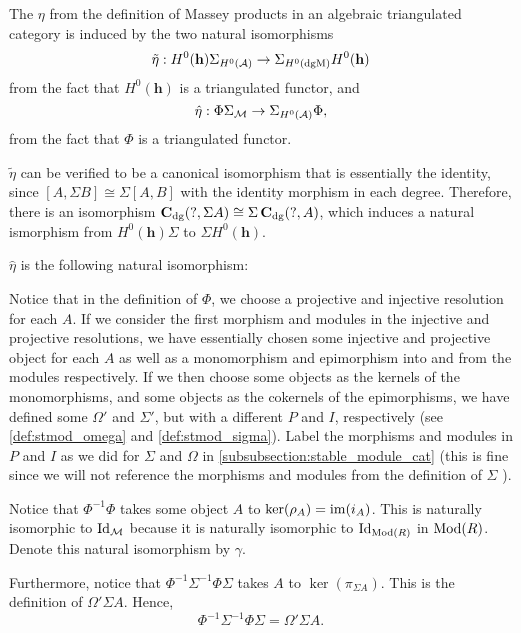 \begin{remark}
    The \( \eta \) from the definition of Massey products in an algebraic triangulated category is induced by the two natural isomorphisms
    \[
        \tilde{\eta}: H^0(\mathbf{h}) \Sigma_{H^0({\mathcal{A}})} \to \Sigma_{H^0(\operatorname{dgM})} H^0(\mathbf{h})
    \]
    from the fact that \( H^0(\mathbf{h}) \) is a triangulated functor, and
    \[
        \hat{\eta}: \Phi \Sigma_{{\mathcal{M}}} \to \Sigma_{H^0({\mathcal{A}})} \Phi,
    \]
    from the fact that \( \Phi \) is a triangulated functor.

    \( \tilde{\eta} \) can be verified to be a canonical isomorphism that is essentially the identity, since \( [A, \Sigma B] \cong \Sigma [A, B] \) with the identity morphism in each degree. Therefore, there is an isomorphism \( \operatorname{\mathbf{C}}_{\operatorname{dg}}(?, \Sigma A) \cong \Sigma \operatorname{\mathbf{C}}_{\operatorname{dg}}(?, A) \), which induces a natural ismorphism from \( H^0(\mathbf{h}) \Sigma \) to \( \Sigma H^0(\mathbf{h}) \).

    \( \hat{\eta} \) is the following natural isomorphism:

    Notice that in the definition of \( \Phi \), we choose a projective and injective resolution for each \( A \). If we consider the first morphism and modules in the injective and projective resolutions, we have essentially chosen some injective and projective object for each \( A \) as well as a monomorphism and epimorphism into and from the modules respectively. If we then choose some objects as the kernels of the monomorphisms, and some objects as the cokernels of the epimorphisms, we have defined some \( \Omega' \) and \( \Sigma' \), but with a different \( P \) and \( I \), respectively (see \autoref{def:stmod_omega} and \autoref{def:stmod_sigma}). Label the morphisms and modules in \( P \) and \( I \) as we did for \( \Sigma \) and \( \Omega \) in \autoref{subsubsection:stable_module_cat} (this is fine since we will not reference the morphisms and modules from the definition of \( \Sigma \) ).

    Notice that \( \Phi^{-1} \Phi \) takes some object \( A \) to \( \ker(\rho_A) = \operatorname{im}(i_A) \). This is naturally isomorphic to \( \operatorname{Id}_{{\mathcal{M}}} \) because it is naturally isomorphic to \( \operatorname{Id}_{\operatorname{Mod}(R)} \) in \( \operatorname{Mod}(R) \). Denote this natural isomorphism by \( \gamma \).
    
    Furthermore, notice that \( \Phi^{-1} \Sigma^{-1} \Phi \Sigma \) takes \( A \) to \( \ker(\pi_{\Sigma A}) \). This is the definition of \( \Omega' \Sigma A \). Hence,
    \[
        \Phi^{-1} \Sigma^{-1} \Phi \Sigma = \Omega' \Sigma A.
    \]


\end{remark}
